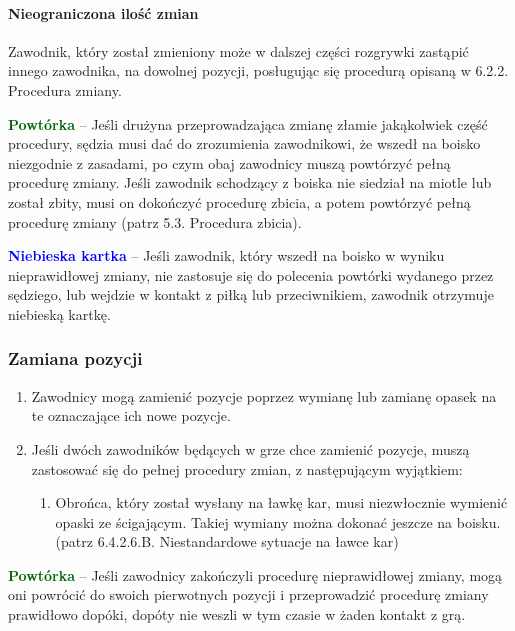 \documentclass[12pt]{article}
\newcommand\bluecard[1]{\bgroup\textcolor{blue}{\textbf{#1}}}
\newcommand\other[1]{\bgroup\textcolor{darkgreen}{\textbf{#1}}}
\begin{document}
\paragraph{Nieograniczona ilość zmian}
Zawodnik, który został
zmieniony może w dalszej części rozgrywki zastąpić innego zawodnika, na
dowolnej pozycji, posługując się procedurą opisaną w 6.2.2. Procedura
zmiany.

\other{Powtórka} -- Jeśli drużyna przeprowadzająca zmianę złamie
jakąkolwiek część procedury, sędzia musi dać do zrozumienia zawodnikowi,
że wszedł na boisko niezgodnie z zasadami, po czym obaj zawodnicy muszą
powtórzyć pełną procedurę zmiany. Jeśli zawodnik schodzący z boiska nie
siedział na miotle lub został zbity, musi on dokończyć procedurę zbicia,
a potem powtórzyć pełną procedurę zmiany (patrz 5.3. Procedura zbicia).

\bluecard{Niebieska kartka} -- Jeśli zawodnik, który wszedł na boisko w
wyniku nieprawidłowej zmiany, nie zastosuje się do polecenia powtórki
wydanego przez sędziego, lub wejdzie w kontakt z piłką lub
przeciwnikiem, zawodnik otrzymuje niebieską kartkę.

\subsubsection{Zamiana pozycji}

\begin{enumerate}
	\item
	      Zawodnicy mogą zamienić pozycje poprzez wymianę lub zamianę opasek na
	      te oznaczające ich nowe pozycje.
	\item
	      Jeśli dwóch zawodników będących w grze chce zamienić pozycje, muszą
	      zastosować się do pełnej procedury zmian, z następującym wyjątkiem:

	      \begin{enumerate}
		      \item
		            Obrońca, który został wysłany na ławkę kar, musi niezwłocznie
		            wymienić opaski ze ścigającym. Takiej wymiany można dokonać jeszcze
		            na boisku. (patrz 6.4.2.6.B. Niestandardowe sytuacje na ławce kar)
	      \end{enumerate}
\end{enumerate}

\other{Powtórka} -- Jeśli zawodnicy zakończyli procedurę nieprawidłowej
zmiany, mogą oni powrócić do swoich pierwotnych pozycji i przeprowadzić
procedurę zmiany prawidłowo dopóki, dopóty nie weszli w
tym czasie w żaden kontakt z grą.
\end{document}
